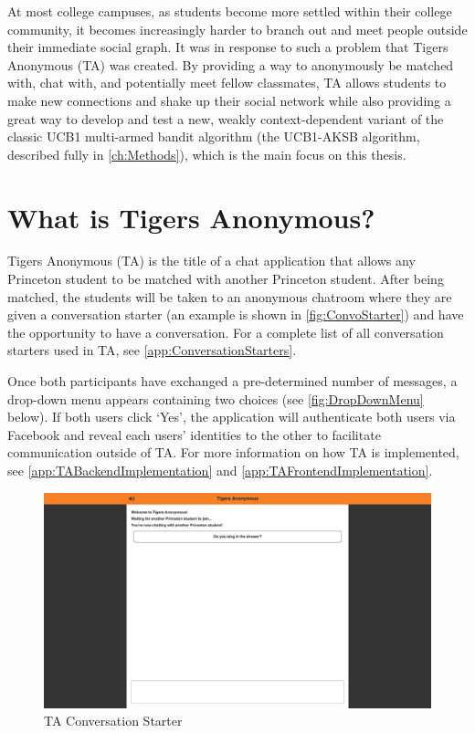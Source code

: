 At most college campuses, as students become more settled within their college community, it becomes increasingly harder to branch out and meet people outside their immediate social graph. It was in response to such a problem that Tigers Anonymous (TA) was created. By providing a way to anonymously be matched with, chat with, and potentially meet fellow classmates, TA allows students to make new connections and shake up their social network while also providing a great way to develop and test a new, weakly context-dependent variant of the classic UCB1 multi-armed bandit algorithm (the UCB1-AKSB algorithm, described fully in \autoref{ch:Methods}), which is the main focus on this thesis.

\section{What is Tigers Anonymous?}

Tigers Anonymous (TA) is the title of a chat application that allows any Princeton student to be matched with another Princeton student. After being matched, the students will be taken to an anonymous chatroom where they are given a conversation starter (an example is shown in \autoref{fig:ConvoStarter}) and have the opportunity to have a conversation. For a complete list of all conversation starters used in TA, see \autoref{app:ConversationStarters}. 

Once both participants have exchanged a pre-determined number of messages, a drop-down menu appears containing two choices (see \autoref{fig:DropDownMenu} below). If both users click `Yes', the application will authenticate both users via Facebook and reveal each users' identities to the other to facilitate communication outside of TA. For more information on how TA is implemented, see \autoref{app:TABackendImplementation} and \autoref{app:TAFrontendImplementation}.

\begin{figure}[h]
\centering
\includegraphics[trim= 120mm 250mm 120mm 0mm, clip, scale=0.36]{./Figures/ConversationStarter}
\caption{TA Conversation Starter}
\label{fig:ConvoStarter}
\end{figure}

